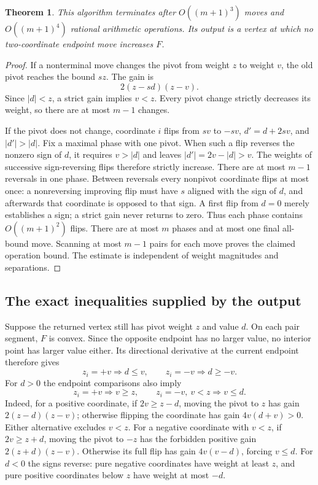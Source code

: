 \documentclass[11pt]{amsart}
\numberwithin{equation}{section}
\newtheorem{theorem}{Theorem}[section]
\theoremstyle{definition}
\begin{document}
\begin{theorem}\label{thm:exchange}
This algorithm terminates after $O((m+1)^3)$ moves and
$O((m+1)^4)$ rational arithmetic operations. Its output is a vertex at
which no two-coordinate endpoint move increases $F$.
\end{theorem}
\begin{proof}
If a nonterminal move changes the pivot from weight $z$ to weight $v$,
the old pivot reaches the bound $sz$. The gain is
\[
 2(z-sd)(z-v).
\]
Since $|d|<z$, a strict gain implies $v<z$. Every pivot change strictly
decreases its weight, so there are at most $m-1$ changes.

If the pivot does not change, coordinate $i$ flips from $sv$ to $-sv$,
$d'=d+2sv$, and $|d'|>|d|$. Fix a maximal phase with one pivot.
When such a flip reverses the nonzero sign of $d$, it requires $v>|d|$
and leaves $|d'|=2v-|d|>v$. The weights of successive sign-reversing
flips therefore strictly increase. There are at most $m-1$ reversals in
one phase. Between reversals every nonpivot coordinate flips at most
once: a nonreversing improving flip must have $s$ aligned with the sign
of $d$, and afterwards that coordinate is opposed to that sign. A first
flip from $d=0$ merely establishes a sign; a strict gain never returns
to zero. Thus each phase contains $O((m+1)^2)$ flips.
There are at most $m$ phases and at most one final all-bound move.
Scanning at most $m-1$ pairs for each move proves the claimed operation
bound. The estimate is independent of weight magnitudes and separations.
\end{proof}

\subsection{The exact inequalities supplied by the output}
Suppose the returned vertex still has pivot weight $z$ and value $d$.
On each pair segment, $F$ is convex. Since the opposite endpoint has no
larger value, no interior point has larger value either. Its directional
derivative at the current endpoint therefore gives
\begin{equation}
 z_i=+v\Rightarrow d\le v,\qquad
 z_i=-v\Rightarrow d\ge-v.                         \label{eq:old-B-1}
\end{equation}
For $d>0$ the endpoint comparisons also imply
\begin{equation}
 z_i=+v\Rightarrow v\ge z,\qquad
 z_i=-v,\ v<z\Rightarrow v\le d.                  \label{eq:old-B-2}
\end{equation}
Indeed, for a positive coordinate, if $2v\ge z-d$, moving the pivot to
$z$ has gain $2(z-d)(z-v)$; otherwise flipping the coordinate has gain
$4v(d+v)>0$. Either alternative excludes $v<z$. For a negative coordinate
with $v<z$, if $2v\ge z+d$, moving the pivot to $-z$ has the forbidden
positive gain $2(z+d)(z-v)$. Otherwise its full flip has gain
$4v(v-d)$, forcing $v\le d$. For $d<0$ the signs reverse: pure negative
coordinates have weight at least $z$, and pure positive coordinates
below $z$ have weight at most $-d$.
\end{document}
